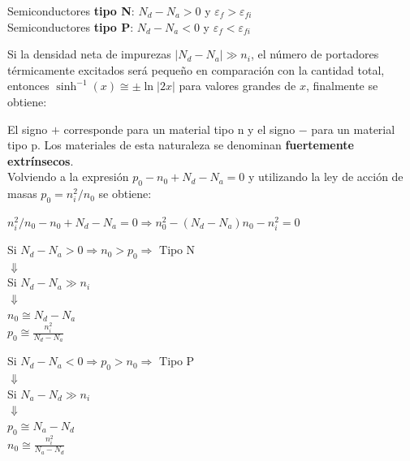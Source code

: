 \documentclass[oneside]{book}
\numberwithin{equation}{section}
\numberwithin{figure}{section}
\numberwithin{table}{section}
\begin{document}
			\begin{center}
				Semiconductores \textbf{tipo N}: $N_d-N_a>0$ y $\varepsilon_f>\varepsilon_{fi}$\\
				Semiconductores \textbf{tipo P}: $N_d-N_a<0$ y  $\varepsilon_f<\varepsilon_{fi}$\\
			\end{center}
			
			Si la densidad neta de impurezas $|N_d-N_a| \gg n_i$, el número de portadores térmicamente excitados será pequeño en comparación con la cantidad total, entonces $\displaystyle \sinh^{-1}(x) \cong \pm\ln |2x|$ para valores grandes de $x$, finalmente se obtiene:\\
			
			\begin{center}
			\end{center}
			
			El signo $+$ corresponde para un material tipo n y el signo $-$ para un material tipo p. Los materiales de esta naturaleza se denominan \textbf{fuertemente extrínsecos}.\\
			
			Volviendo a la expresión $p_0-n_0+N_d-N_a=0$ y utilizando la ley de acción de masas $p_0=n_i^2/n_0$ se obtiene:
			
			\begin{center}
				$\displaystyle n_i^2/n_0-n_0+N_d-N_a=0 \Rightarrow n_0^2-(N_d-N_a)n_0-n_i^2=0$\\
			\end{center}
					
			\begin{minipage}[T]{0.4\textwidth}
				\begin{center}
					Si $N_d-N_a>0 \Longrightarrow n_0>p_0 \Longrightarrow \text{ Tipo N }$\\
					$\Downarrow$\\
					Si $N_d-N_a \gg n_i$\\
					$\Downarrow$\\
					$n_0 \cong N_d-N_a$\\
					$\displaystyle p_0 \cong \frac{n_i^2}{N_d-N_a}$\\
				\end{center}
			\end{minipage}
			\begin{minipage}[T]{0.5\textwidth}
				\begin{center}
					Si $N_d-N_a<0 \Longrightarrow p_0>n_0 \Longrightarrow \text{ Tipo P }$\\
					$\Downarrow$\\
					Si $N_a-N_d \gg n_i$\\
					$\Downarrow$\\
					$p_0 \cong N_a-N_d$\\
					$\displaystyle n_0 \cong \frac{n_i^2}{N_a-N_d}$\\
				\end{center}
			\end{minipage}
		
\end{document}
